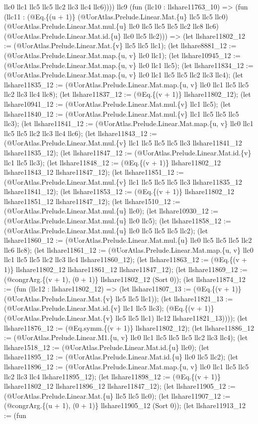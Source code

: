 \documentclass[11pt]{article}
\begin{document}
llc0 llc1 llc5 llc5 llc2 llc3 llc4 llc6)))) llc9 (fun (llc10 : llshare11763\_10) => (fun (llc11 : (@Eq.\{(u + 1)\} (@UorAtlas.Prelude.Linear.Mat.\{u\} llc5 llc5 llc0) (@UorAtlas.Prelude.Linear.Mat.mul.\{u\} llc0 llc5 llc5 llc5 llc2 llc8 llc6) (@UorAtlas.Prelude.Linear.Mat.id.\{u\} llc0 llc5 llc2))) => (let llshare11802\_12 := (@UorAtlas.Prelude.Linear.Mat.\{v\} llc5 llc5 llc1); (let llshare8881\_12 := (@UorAtlas.Prelude.Linear.Mat.map.\{u, v\} llc0 llc1); (let llshare10945\_12 := (@UorAtlas.Prelude.Linear.Mat.map.\{u, v\} llc0 llc1 llc5); (let llshare11834\_12 := (@UorAtlas.Prelude.Linear.Mat.map.\{u, v\} llc0 llc1 llc5 llc5 llc2 llc3 llc4); (let llshare11835\_12 := (@UorAtlas.Prelude.Linear.Mat.map.\{u, v\} llc0 llc1 llc5 llc5 llc2 llc3 llc4 llc8); (let llshare11837\_12 := (@Eq.\{(v + 1)\} llshare11802\_12); (let llshare10941\_12 := (@UorAtlas.Prelude.Linear.Mat.mul.\{v\} llc1 llc5); (let llshare11840\_12 := (@UorAtlas.Prelude.Linear.Mat.mul.\{v\} llc1 llc5 llc5 llc5 llc3); (let llshare11841\_12 := (@UorAtlas.Prelude.Linear.Mat.map.\{u, v\} llc0 llc1 llc5 llc5 llc2 llc3 llc4 llc6); (let llshare11843\_12 := (@UorAtlas.Prelude.Linear.Mat.mul.\{v\} llc1 llc5 llc5 llc5 llc3 llshare11841\_12 llshare11835\_12); (let llshare11847\_12 := (@UorAtlas.Prelude.Linear.Mat.id.\{v\} llc1 llc5 llc3); (let llshare11848\_12 := (@Eq.\{(v + 1)\} llshare11802\_12 llshare11843\_12 llshare11847\_12); (let llshare11851\_12 := (@UorAtlas.Prelude.Linear.Mat.mul.\{v\} llc1 llc5 llc5 llc5 llc3 llshare11835\_12 llshare11841\_12); (let llshare11853\_12 := (@Eq.\{(v + 1)\} llshare11802\_12 llshare11851\_12 llshare11847\_12); (let llshare1510\_12 := (@UorAtlas.Prelude.Linear.Mat.mul.\{u\} llc0); (let llshare10930\_12 := (@UorAtlas.Prelude.Linear.Mat.mul.\{u\} llc0 llc5); (let llshare11858\_12 := (@UorAtlas.Prelude.Linear.Mat.mul.\{u\} llc0 llc5 llc5 llc5 llc2); (let llshare11860\_12 := (@UorAtlas.Prelude.Linear.Mat.mul.\{u\} llc0 llc5 llc5 llc5 llc2 llc6 llc8); (let llshare11861\_12 := (@UorAtlas.Prelude.Linear.Mat.map.\{u, v\} llc0 llc1 llc5 llc5 llc2 llc3 llc4 llshare11860\_12); (let llshare11863\_12 := (@Eq.\{(v + 1)\} llshare11802\_12 llshare11861\_12 llshare11847\_12); (let llshare11869\_12 := (@congrArg.\{(v + 1), (0 + 1)\} llshare11802\_12 (Sort 0)); (let llshare11874\_12 := (fun (llc12 : llshare11802\_12) => (let llshare11807\_13 := (@Eq.\{(v + 1)\} (@UorAtlas.Prelude.Linear.Mat.\{v\} llc5 llc5 llc1)); (let llshare11821\_13 := (@UorAtlas.Prelude.Linear.Mat.id.\{v\} llc1 llc5 llc3); (@Eq.\{(v + 1)\} (@UorAtlas.Prelude.Linear.Mat.\{v\} llc5 llc5 llc1) llc12 llshare11821\_13)))); (let llshare11876\_12 := (@Eq.symm.\{(v + 1)\} llshare11802\_12); (let llshare11886\_12 := (@UorAtlas.Prelude.Linear.M1.\{u, v\} llc0 llc1 llc5 llc5 llc5 llc2 llc3 llc4); (let llshare1518\_12 := (@UorAtlas.Prelude.Linear.Mat.id.\{u\} llc0); (let llshare11895\_12 := (@UorAtlas.Prelude.Linear.Mat.id.\{u\} llc0 llc5 llc2); (let llshare11896\_12 := (@UorAtlas.Prelude.Linear.Mat.map.\{u, v\} llc0 llc1 llc5 llc5 llc2 llc3 llc4 llshare11895\_12); (let llshare11898\_12 := (@Eq.\{(v + 1)\} llshare11802\_12 llshare11896\_12 llshare11847\_12); (let llshare11905\_12 := (@UorAtlas.Prelude.Linear.Mat.\{u\} llc5 llc5 llc0); (let llshare11907\_12 := (@congrArg.\{(u + 1), (0 + 1)\} llshare11905\_12 (Sort 0)); (let llshare11913\_12 := (fun 
\end{document}
